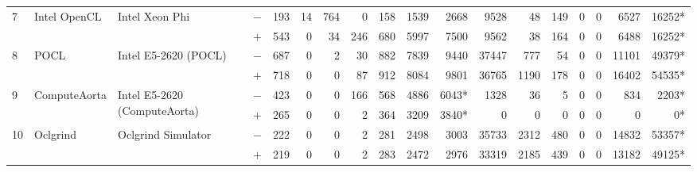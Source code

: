 \begin{tabular}{llll | rrrrrrr | rrrrrrr }
\hline
\multirow{ 2}{*}{7} & \multirow{ 2}{*}{Intel OpenCL} & \multirow{ 2}{*}{Intel Xeon Phi} & $-$ & 193 & 14 & 764 & 0 & 158 & 1539 & 2668       & 9528 & 48 & 149 & 0 & 0 & 6527 & 16252* \\& & & $+$ & 543 & 0 & 34 & 246 & 680 & 5997 & 7500 & 9562 & 38 & 164 & 0 & 0 & 6488 & 16252* \\
\hline
\multirow{ 2}{*}{8} & \multirow{ 2}{*}{POCL} & \multirow{ 2}{*}{Intel E5-2620 (POCL)} & $-$ & 687 & 0 & 2 & 30 & 882 & 7839 & 9440       & 37447 & 777 & 54 & 0 & 0 & 11101 & 49379* \\& & & $+$ & 718 & 0 & 0 & 87 & 912 & 8084 & 9801 & 36765 & 1190 & 178 & 0 & 0 & 16402 & 54535* \\
\hline
\multirow{ 2}{*}{9} & \multirow{ 2}{*}{ComputeAorta} & \multirow{ 2}{*}{Intel E5-2620 (ComputeAorta)} & $-$ & 423 & 0 & 0 & 166 & 568 & 4886 & 6043*       & 1328 & 36 & 5 & 0 & 0 & 834 & 2203* \\& & & $+$ & 265 & 0 & 0 & 2 & 364 & 3209 & 3840* & 0 & 0 & 0 & 0 & 0 & 0 & 0* \\
\hline
\multirow{ 2}{*}{10} & \multirow{ 2}{*}{Oclgrind} & \multirow{ 2}{*}{Oclgrind Simulator} & $-$ & 222 & 0 & 0 & 2 & 281 & 2498 & 3003       & 35733 & 2312 & 480 & 0 & 0 & 14832 & 53357* \\& & & $+$ & 219 & 0 & 0 & 2 & 283 & 2472 & 2976 & 33319 & 2185 & 439 & 0 & 0 & 13182 & 49125* \\
  \bottomrule
\end{tabular}

